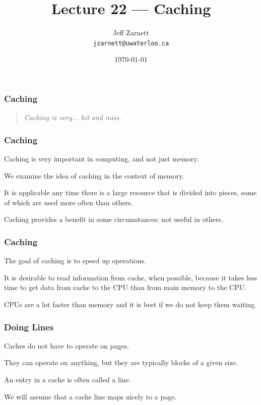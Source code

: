 

\title{Lecture 22 --- Caching }

\author{Jeff Zarnett \\ \small \texttt{jzarnett@uwaterloo.ca}}
\date{\today}




\begin{frame}
  \titlepage

 \end{frame}

\begin{frame}
\frametitle{Caching}

\vspace{5em}

\begin{quote}
\textit{Caching is very... hit and miss.}
\end{quote}

\end{frame}

\begin{frame}
\frametitle{Caching}

Caching is very important in computing, and not just memory. 

We examine the idea of caching in the context of memory.

It is applicable any time there is a large resource that is divided into pieces, some of which are used more often than others. 

Caching provides a benefit in some circumstances; not useful in others. 


\end{frame}

\begin{frame}
\frametitle{Caching}

The goal of caching is to speed up operations. 

It is desirable to read information from cache, when possible, because it takes less time to get data from cache to the CPU than from main memory to the CPU. 

CPUs are a lot faster than memory and it is best if we do not keep them waiting.

\end{frame}

\begin{frame}
\frametitle{Doing Lines}

Caches do not have to operate on pages. 

They can operate on anything, but they are typically blocks of a given size. 

An entry in a cache is often called a \alert{line}. 

We will assume that a cache line maps nicely to a page.

\end{frame}

